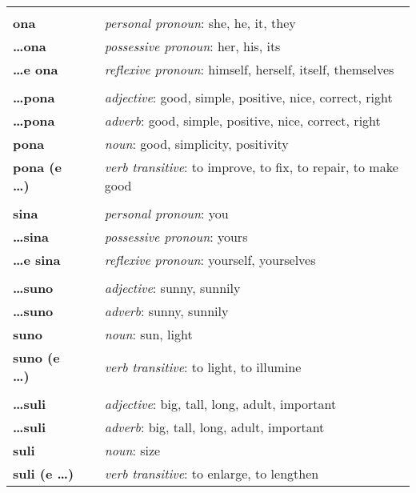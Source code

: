 \begin{supertabular}{p{2,5cm}|ll}
 && \\ %
%
\textbf{ona} && \textit{personal pronoun}: she, he, it, they \\ %
\textbf{\dots ona} && \textit{possessive pronoun}: her, his, its \\  %
\textbf{\dots e ona} && \textit{reflexive pronoun}: himself, herself, itself, themselves \\  
 && \\ %
%  
\textbf{\dots pona} && \textit{adjective}: good, simple, positive, nice, correct, right \\ %
\textbf{\dots pona} && \textit{adverb}: good, simple, positive, nice, correct, right \\ %
\textbf{pona} && \textit{noun}: good, simplicity, positivity \\ %
\textbf{pona (e \dots)} && \textit{verb transitive}: to improve, to fix, to repair, to make good \\ %
 && \\ %
%
\textbf{sina} && \textit{personal pronoun}: you \\ %
\textbf{\dots sina} && \textit{possessive pronoun}: yours \\  %
\textbf{\dots e sina} && \textit{reflexive pronoun}: yourself, yourselves \\  
 && \\ %
%
\textbf{\dots suno} && \textit{adjective}: sunny, sunnily \\ %
\textbf{\dots suno} && \textit{adverb}: sunny, sunnily \\ %
\textbf{suno} && \textit{noun}: sun, light \\ %
\textbf{suno (e \dots)} && \textit{verb transitive}: to light, to illumine \\ %
 && \\ %
%
\textbf{\dots suli} && \textit{adjective}: big, tall, long, adult, important \\ %
\textbf{\dots suli} && \textit{adverb}: big, tall, long, adult, important \\ %
\textbf{suli} && \textit{noun}: size \\ %
\textbf{suli (e \dots)} && \textit{verb transitive}: to enlarge, to lengthen \\ %

\end{supertabular}
